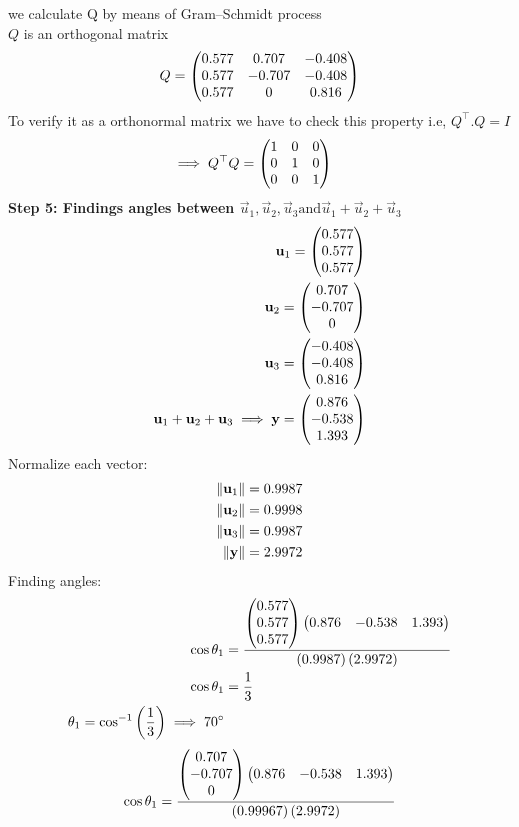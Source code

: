 \documentclass[11pt]{book}
\begin{document}
\begin{enumerate}
we calculate Q by means of Gram–Schmidt process\\
$Q$ is an orthogonal matrix 
\begin{align*}
    Q=\begin{pmatrix} 0.577&0.707&-0.408\\0.577&-0.707&-0.408\\0.577&0&0.816\end{pmatrix}
\end{align*}
To verify it as a orthonormal matrix we have to check this property i.e,  $Q^{\top}.Q =I$
\begin{align*}
    \implies Q^\top Q &= \begin{pmatrix}1&0&0\\0&1&0\\0&0&1\end{pmatrix}
\end{align*}
\textbf{Step 5: Findings angles between $\vec{u}_1,\vec{u}_2,\vec{u}_3 \text{and} \vec{u}_1+\vec{u}_2+\vec{u}_3 $}
\begin{align}
    \mathbf{u}_1=\begin{pmatrix}0.577\\0.577\\0.577\end{pmatrix}\\
    \mathbf{u}_2=\begin{pmatrix}0.707 \\ -0.707 \\ 0\end{pmatrix} \\
    \mathbf{u}_3=\begin{pmatrix}-0.408\\-0.408\\0.816\end{pmatrix}\\
    \mathbf{u}_1+\mathbf{u}_2+\mathbf{u}_3\implies\mathbf{y}=\begin{pmatrix}0.876\\-0.538\\1.393\end{pmatrix}
\end{align}
Normalize each vector:\\
   \begin{align}
    \left\lVert\mathbf{u}_1\right\rVert=0.9987\\
    \left\lVert\mathbf{u}_2\right\rVert=0.9998\\
     \left\lVert\mathbf{u}_3\right\rVert=0.9987\\
     \left\lVert\mathbf{y}\right\rVert=2.9972
   \end{align}
Finding angles:
\begin{align}
    \cos{\theta_1}&=\frac{\begin{pmatrix}0.577 \\0.577 \\0.577\end{pmatrix}\begin{pmatrix}0.876&-0.538&1.393\end{pmatrix}}{\left(0.9987\right)\left(2.9972\right)}\\
    \cos{\theta_1}&=\frac{1}{3}\\
    \theta_1=\cos^{-1}\left(\frac{1}{3}\right)
    \implies 70\degree
\end{align}
\begin{align}
   \cos{\theta_1}&=\frac{\myvec{0.707 \\-0.707 \\0}\myvec{0.876&-0.538&1.393}}{\brak{0.99967}\brak{2.9972}}\\

\end{align}
\end{enumerate}
\end{document}
